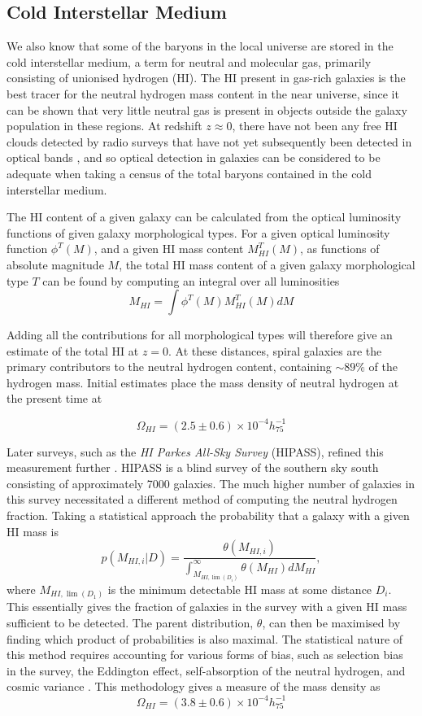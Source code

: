 \subsection{Cold Interstellar Medium}
We also know that some of the baryons in the local universe are stored in the cold interstellar medium, a term for neutral and molecular gas, primarily consisting of unionised hydrogen (HI). The HI present in gas-rich galaxies is the best tracer for the neutral hydrogen mass content in the near universe, since it can be shown that very little neutral gas is present in objects outside the galaxy population in these regions. At redshift $z \approx 0$, there have not been any free HI clouds detected by radio surveys that have not yet subsequently been detected in optical bands \citep{1993ApJ...419..515R}, and so optical detection in galaxies can be considered to be adequate when taking a census of the total baryons contained in the cold interstellar medium. 
\par The HI content of a given galaxy can be calculated from the optical luminosity functions of given galaxy morphological types. For a given optical luminosity function $\phi^T(M)$, and a given HI mass content $M_{HI}^T(M)$, as functions of absolute magnitude $M$, the total HI mass content of a given galaxy morphological type $T$ can be found by computing an integral over all luminosities
$$M_{HI} = \int \phi^T(M) M_{HI}^T(M) dM $$

Adding all the contributions for all morphological types will therefore give an estimate of the total HI at $z=0$. At these distances, spiral galaxies are the primary contributors to the neutral hydrogen content, containing $\sim 89\%$ of the hydrogen mass. Initial estimates \citep{1993ApJ...419..515R} place the mass density of neutral hydrogen at the present time at 

$$\Omega_{HI} = (2.5 \pm 0.6) \times 10^{-4} h_{75}^{-1} $$

Later surveys, such as the \emph{HI Parkes All-Sky Survey} (HIPASS), refined this measurement further \citep{2003AJ....125.2842Z}. HIPASS is a blind survey of the southern sky south consisting of approximately 7000 galaxies. The much higher number of galaxies in this survey necessitated a different method of computing the neutral hydrogen fraction. Taking a statistical approach the probability that a galaxy with a given HI mass is
$$ p(M_{HI,i}|D) = \frac{\theta(M_{HI,i})}{\int_{M_{HI,\lim(D_i)}}^\infty \theta(M_{HI}) dM_{HI}}, $$
where $M_{HI,\lim(D_1)}$ is the minimum detectable HI mass at some distance $D_i$. This essentially gives the fraction of galaxies in the survey with a given HI mass sufficient to be detected. The parent distribution, $\theta$, can then be maximised by finding which product of probabilities is also maximal. The statistical nature of this method requires accounting for various forms of bias, such as selection bias in the survey, the Eddington effect, self-absorption of the neutral hydrogen, and cosmic variance \citep{2012ApJ...759...23S}. This methodology gives a measure of the mass density as 
$$\Omega_{HI} = (3.8 \pm 0.6) \times 10^{-4} h_{75}^{-1} $$
